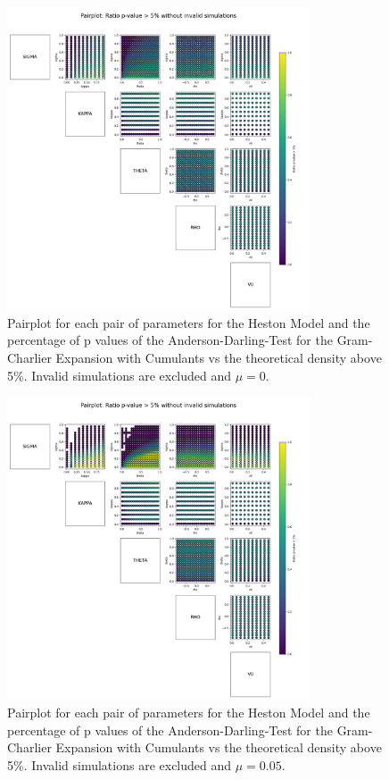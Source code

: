 \begin{figure}
    \centering
    \includegraphics[width=0.8\textwidth]{img/pairplot_GC_cum_AD_muzero.png}
    \caption{Pairplot for each pair of parameters for the Heston Model and the percentage of p values of the Anderson-Darling-Test for the Gram-Charlier Expansion with Cumulants vs the theoretical density above 5\%. Invalid simulations are excluded and $\mu=0$.}
    \label{fig:pairplot_GC_cum_AD_muzero}
\end{figure}

\begin{figure}
    \centering
    \includegraphics[width=0.8\textwidth]{img/pairplot_GC_cum_AD.png}
    \caption{Pairplot for each pair of parameters for the Heston Model and the percentage of p values of the Anderson-Darling-Test for the Gram-Charlier Expansion with Cumulants vs the theoretical density above 5\%. Invalid simulations are excluded and $\mu=0.05$.}
    \label{fig:pairplot_GC_cum_AD_mu005}
\end{figure}